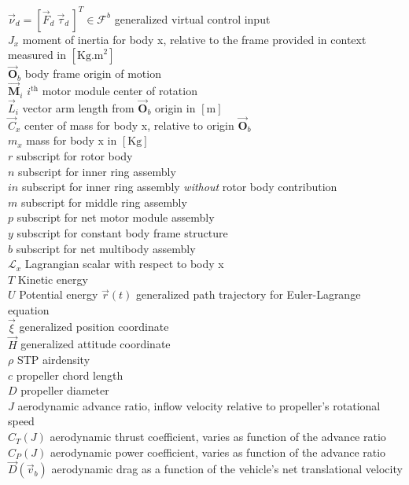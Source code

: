 \documentclass[a4paper, 11pt, oneside, openright, parskip=full]{book}
\begin{document}
$\vec{\nu}_d=[\vec{F}_d~\vec{\tau}_d\hspace{2pt}]^T\in\mathcal{F}^b$ generalized virtual control input\\
$J_x$ moment of inertia for body x, relative to the frame provided in context measured in $[\text{Kg.m}^{2}]$\\
$\vec{\mathbf{O}}_b$ body frame origin of motion\\
$\vec{\mathbf{M}}_i$ $i^\text{th}$ motor module center of rotation\\
$\vec{L}_i$ vector arm length from $\vec{\mathbf{O}}_b$ origin in $[\text{m}]$\\
$\vec{C}_x$ center of mass for body x, relative to origin $\vec{\mathbf{O}}_b$\\
$m_x$ mass for body x in $[\text{Kg}]$\\
$r$ subscript for rotor body\\
$n$ subscript for inner ring assembly\\
$in$ subscript for inner ring assembly \emph{without} rotor body contribution\\
$m$ subscript for middle ring assembly\\
$p$ subscript for net motor module assembly\\
$y$ subscript for constant body frame structure\\
$b$ subscript for net multibody assembly\\
$\mathcal{L}_x$ Lagrangian scalar with respect to body x\\
$T$ Kinetic energy\\
$U$ Potential energy
$\vec{r}(t)$ generalized path trajectory for Euler-Lagrange equation\\
$\vec{\xi}$ generalized position coordinate\\
$\vec{H}$ generalized attitude coordinate\\
$\rho$ STP airdensity\\
$c$ propeller chord length\\
$D$ propeller diameter\\
$J$ aerodynamic advance ratio, inflow velocity relative to propeller's rotational speed\\
$C_T(J)$ aerodynamic thrust coefficient, varies as function of the advance ratio\\
$C_P(J)$ aerodynamic power coefficient, varies as function of the advance ratio\\
$\vec{D}(\vec{v}_b)$ aerodynamic drag as a function of the vehicle's net translational velocity\\
\end{document}
